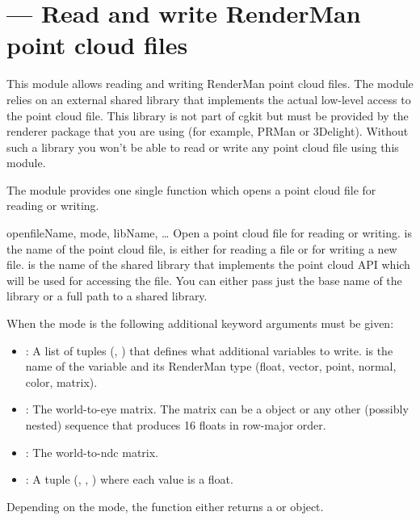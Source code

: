 
\section{ ---
         Read and write RenderMan point cloud files}
\label{pointcloud}


This module allows reading and writing RenderMan point cloud files. The module
relies on an external shared library that implements the actual low-level
access to the point cloud file. This library is not part of cgkit but must
be provided by the renderer package that you are using (for example, PRMan or
3Delight). Without such a library you won't be able to read or write any
point cloud file using this module.

The module provides one single function  which opens a
point cloud file for reading or writing. 

\begin{funcdesc}{open}{fileName, mode, libName, \ldots}
Open a point cloud file for reading or writing.  is the name
of the point cloud file,  is either  for reading a file or
 for writing a new file.  is the name of the shared
library that implements the point cloud API which will be used for accessing
the file. You can either pass just the base name of the library or a full path
to a shared library.

When the mode is  the following additional keyword arguments must
be given:
\begin{itemize}
  \item {}: A list of tuples (, ) that defines what
  additional variables to write.  is the name of the
  variable and  its RenderMan type (float, vector, point, normal,
  color, matrix).
  \item {}: The world-to-eye matrix. The matrix can be a
   object or any other (possibly nested) sequence that produces 16
  floats in row-major order.
  \item {}: The world-to-ndc matrix.
  \item {}: A tuple (, , ) where
  each value is a float.
\end{itemize}

Depending on the mode, the function either returns a 
or  object.
\end{funcdesc}

